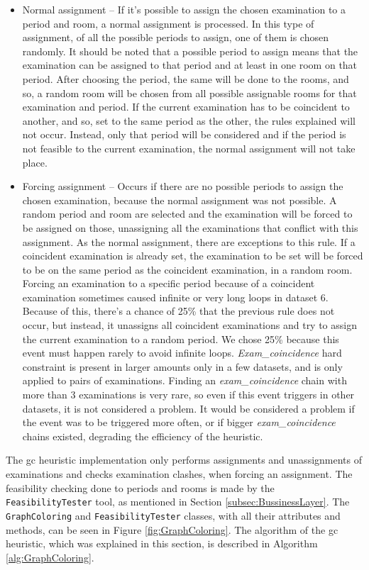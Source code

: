 \begin{itemize}
	\item Normal assignment -- If it's possible to assign the chosen examination to a period and room, a normal assignment is processed. In this type of assignment, of all the possible periods to assign, one of them is chosen randomly. It should be noted that a possible period to assign means that the examination can be assigned to that period and at least in one room on that period. After choosing the period, the same will be done to the rooms, and so, a random room will be chosen from all possible assignable rooms for that examination and period. If the current examination has to be coincident to another, and so, set to the same period as the other, the rules explained will not occur. Instead, only that period will be considered and if the period is not feasible to the current examination, the normal assignment will not take place. \\
	\item Forcing assignment -- Occurs if there are no possible periods to assign the chosen examination, because the normal assignment was not possible. A random period and room are selected and the examination will be forced to be assigned on those, unassigning all the examinations that conflict with this assignment. As the normal assignment, there are exceptions to this rule. If a coincident examination is already set, the examination to be set will be forced to be on the same period as the coincident examination, in a random room. Forcing an examination to a specific period because of a coincident examination sometimes caused infinite or very long loops in dataset 6. Because of this, there's a chance of 25\% that the previous rule does not occur, but instead, it unassigns all coincident examinations and try to assign the current examination to a random period. We chose 25\% because this event must happen rarely to avoid infinite loops. \textit{Exam\_coincidence} hard constraint is present in larger amounts only in a few datasets, and is only applied to pairs of examinations. Finding an \textit{exam\_coincidence} chain with more than 3 examinations is very rare, so even if this event triggers in other datasets, it is not considered a problem. It would be considered a problem if the event was to be triggered more often, or if bigger \textit{exam\_coincidence} chains existed, degrading the efficiency of the heuristic.
\end{itemize}
The \gls{gc} heuristic implementation only performs assignments and unassignments of examinations and checks examination clashes, when forcing an assignment. The feasibility checking done to periods and rooms is made by the \verb+FeasibilityTester+ tool, as mentioned in Section \ref{subsec:BussinessLayer}. The \verb+GraphColoring+ and \verb+FeasibilityTester+ classes, with all their attributes and methods, can be seen in Figure \ref{fig:GraphColoring}. The algorithm of the \gls{gc} heuristic, which was explained in this section, is described in Algorithm \ref{alg:GraphColoring}.\\

